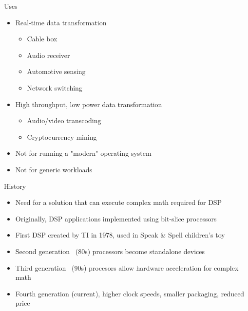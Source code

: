 \documentclass{beamer}
\begin{document}
\begin{frame}{Uses}
    \begin{itemize}
        \item Real-time data transformation
            \begin{itemize}
                \item Cable box
                \item Audio receiver
                \item Automotive sensing
                \item Network switching
            \end{itemize}
        \item High throughput, low power data transformation
            \begin{itemize}
                \item Audio/video transcoding
                \item Cryptocurrency mining
            \end{itemize}
        \item Not for running a "modern" operating system %
        \item Not for generic workloads %
    \end{itemize}
\end{frame}

\begin{frame}{History}
    \begin{itemize}
        \item Need for a solution that can execute complex math required for
            DSP
        \item Originally, DSP applications implemented using bit-slice
            processors
        \item First DSP created by TI in 1978, used in Speak \& Spell
            children's toy
        \item Second generation ~(80s) processors become standalone devices
        \item Third generation ~(90s) procesors allow hardware acceleration for
            complex math
        \item Fourth generation (current), higher clock speeds, smaller
            packaging, reduced price
    \end{itemize}
\end{frame}
\end{document}

